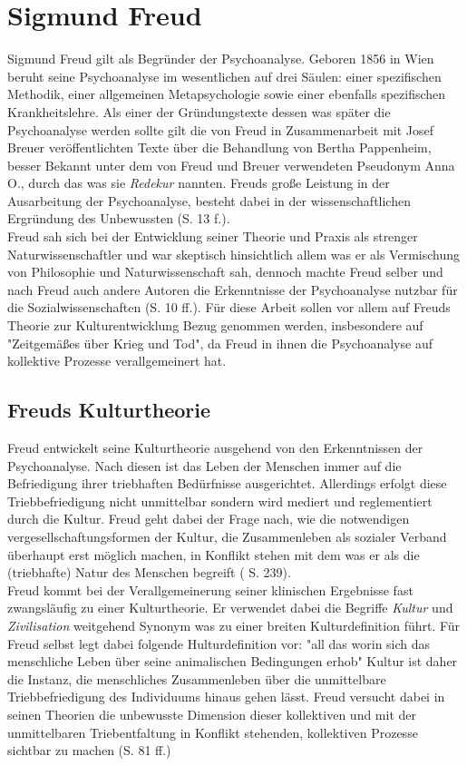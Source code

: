 \documentclass[11pt,a4paper,oneside,numbers=noenddot,bibliography=totocnumbered,DIV=13]{scrartcl}
\begin{document}
\section{Sigmund Freud}
Sigmund Freud gilt als Begründer der Psychoanalyse. 
Geboren 1856 in Wien beruht seine Psychoanalyse im wesentlichen auf drei Säulen: einer spezifischen Methodik, einer allgemeinen Metapsychologie sowie einer ebenfalls spezifischen Krankheitslehre. 
Als einer der Gründungstexte dessen was später die Psychoanalyse werden sollte gilt die von Freud in Zusammenarbeit mit Josef Breuer veröffentlichten Texte über die Behandlung von Bertha Pappenheim, besser Bekannt unter dem von Freud und Breuer verwendeten Pseudonym Anna O., durch das was sie \textit{Redekur} nannten.
Freuds große Leistung in der Ausarbeitung der Psychoanalyse, besteht dabei in der wissenschaftlichen Ergründung des Unbewussten (\cite{berkel_sigmund_2008}S. 13 f.).\\
Freud sah sich bei der Entwicklung seiner Theorie und Praxis als strenger Naturwissenschaftler und war skeptisch hinsichtlich allem was er als Vermischung von Philosophie und Naturwissenschaft sah, dennoch machte Freud selber und nach Freud auch andere Autoren die Erkenntnisse der Psychoanalyse nutzbar für die Sozialwissenschaften (\cite{lohmann_freud-handbuch:_2013}S. 10 ff.).
Für diese Arbeit sollen vor allem auf Freuds Theorie zur Kulturentwicklung Bezug genommen werden, insbesondere auf "Zeitgemäßes über Krieg und Tod", da Freud in ihnen die Psychoanalyse auf kollektive Prozesse verallgemeinert hat.        
\subsection{Freuds Kulturtheorie}
Freud entwickelt seine Kulturtheorie ausgehend von den Erkenntnissen der Psychoanalyse. Nach diesen ist das Leben der Menschen immer auf die Befriedigung ihrer triebhaften Bedürfnisse ausgerichtet. 
Allerdings erfolgt diese Triebbefriedigung nicht unmittelbar sondern wird mediert und reglementiert durch die Kultur. Freud geht dabei der Frage nach, wie die notwendigen vergesellschaftungsformen der Kultur, die Zusammenleben als sozialer Verband überhaupt erst möglich machen, in Konflikt stehen  mit dem was er als die (triebhafte) Natur des Menschen begreift (\cite{lohmann_freud-handbuch:_2013} S. 239). \\
Freud kommt bei der Verallgemeinerung seiner klinischen Ergebnisse fast zwangsläufig zu einer Kulturtheorie. 
Er verwendet dabei die Begriffe \textit{Kultur} und \textit{Zivilisation} weitgehend Synonym was zu einer breiten Kulturdefinition führt. 
Für Freud selbst legt dabei folgende Hulturdefinition vor: "all das worin sich das menschliche Leben über seine animalischen Bedingungen erhob"
Kultur ist daher die Instanz, die menschliches Zusammenleben über die unmittelbare Triebbefriedigung des Individuums hinaus gehen lässt. Freud versucht dabei in seinen Theorien die unbewusste Dimension dieser kollektiven und mit der unmittelbaren Triebentfaltung in Konflikt stehenden, kollektiven Prozesse sichtbar zu machen (\cite{berkel_sigmund_2008}S. 81 ff.)\\
\end{document}
